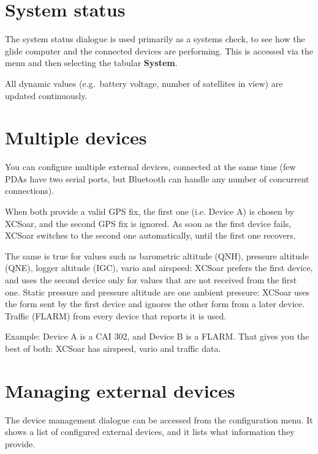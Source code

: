 \section{System status}\label{sec:system-status}

The system status dialogue is
used primarily as a systems check, to see how the glide computer and the 
connected devices are performing.  This is accessed via the menu 
and then selecting the tabular \textbf{System}.

All dynamic values (e.g.\ battery voltage, number of satellites in
view) are updated continuously.

\section{Multiple devices}

You can configure multiple external devices, connected at the same
time (few PDAs have two serial ports, but Bluetooth can handle any
number of concurrent connections).

When both provide a valid GPS fix, the first one (i.e. Device A) is chosen by
XCSoar, and the second GPS fix is ignored.  As soon as the first device fails,
XCSoar switches to the second one automatically, until the first one recovers.

The same is true for values such as barometric altitude (QNH),
pressure altitude (QNE), logger altitude (IGC), vario and
airspeed: XCSoar prefers the first device, and uses the second
device only for values that are not received from the first one.
Static pressure and pressure altitude are one ambient pressure:
XCSoar uses the form sent by the first device and ignores the other
form from a later device.
Traffic (FLARM) from every device that reports it is used.

Example: Device A is a CAI 302, and Device B is a FLARM.
That gives you the best of both: XCSoar has airspeed, vario and
traffic data.


\section{Managing external devices}

The device management dialogue can be accessed from the configuration
menu. It shows a list of configured external devices,
and it lists what information they provide.

